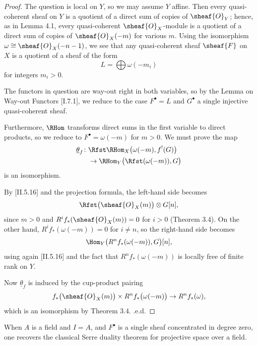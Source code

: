\begin{proof}
The question is local on \(Y\), so we may assume \(Y\) affine. Then every quasi-coherent sheaf on \(Y\) is a quotient of a direct sum of copies of \(\sheaf{O}_Y\); hence, as in Lemma 4.1, every quasi-coherent \(\sheaf{O}_X\)-module is a quotient of a direct sum of copies of \(\sheaf{O}_X(-m)\) for various \(m\). Using the isomorphism \(\omega \cong \sheaf{O}_X(-n-1)\), we see that any quasi-coherent sheaf \(\sheaf{F}\) on \(X\) is a quotient of a sheaf of the form
\[
L=\bigoplus \omega(-m_i)
\]
for integers \(m_i>0\).

The functors in question are way-out right in both variables, so by the Lemma on Way-out Functors [I.7.1], we reduce to the case \(F^\bullet = L\) and \(G^\bullet\) a single injective quasi-coherent sheaf.

\setcounter{page}{162}
Furthermore, \(\RHom\) transforms direct sums in the first variable to direct products, so we reduce to \(F^\bullet=\omega(-m)\) for \(m>0\). We must prove the map
\[
\begin{aligned}
\underline{\theta}_{f}\colon
&\Rfst \RHom_X\bigl(\omega(-m),f^!(G)\bigr) \\
&\to \RHom_Y\bigl(\Rfst(\omega(-m)),G\bigr)
\end{aligned}
\]
is an isomorphism.

By [II.5.16] and the projection formula, the left-hand side becomes
\[
\Rfst\bigl(\sheaf{O}_X(m)\bigr) \otimes G[n],
\]
since \(m>0\) and \(R^i f_*(\sheaf{O}_X(m))=0\) for \(i>0\) (Theorem 3.4). On the other hand, \(R^i f_*(\omega(-m))=0\) for \(i\neq n\), so the right-hand side becomes
\[
\Hom_Y\bigl(R^n f_*(\omega(-m)),G\bigr)[n],
\]
using again [II.5.16] and the fact that \(R^n f_*(\omega(-m))\) is locally free of finite rank on \(Y\).

Now \(\underline{\theta}_f\) is induced by the cup-product pairing
\[
f_*\bigl(\sheaf{O}_X(m)\bigr) \times R^n f_*\bigl(\omega(-m)\bigr)
\to R^n f_*(\omega),
\]
which is an isomorphism by Theorem 3.4.
\q.e.d.
\end{proof}

\setcounter{page}{163}

\begin{remark}
When \(A\) is a field and \(I=A\), and \(F^\bullet\) is a single sheaf concentrated in degree zero, one recovers the classical Serre duality theorem for projective space over a field.
\end{remark}